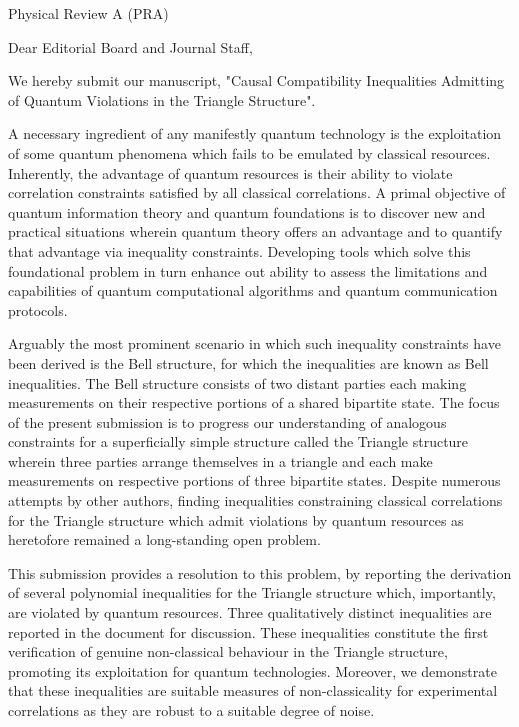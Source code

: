 \documentclass[12pt]{letter}
\begin{document}
\begin{letter}{Physical Review A (PRA)}
{\selectfont
\opening{Dear Editorial Board and Journal Staff,}

We hereby submit our manuscript, "Causal Compatibility Inequalities Admitting of Quantum Violations in the Triangle Structure".


A necessary ingredient of any manifestly quantum technology is the exploitation of some quantum phenomena which fails to be emulated by classical resources. Inherently, the advantage of quantum resources is their ability to violate correlation constraints satisfied by all classical correlations. A primal objective of quantum information theory and quantum foundations is to discover new and practical situations wherein quantum theory offers an advantage and to quantify that advantage via inequality constraints. Developing tools which solve this foundational problem in turn enhance out ability to assess the limitations and capabilities of quantum computational algorithms and quantum communication protocols.


Arguably the most prominent scenario in which such inequality constraints have been derived is the Bell structure, for which the inequalities are known as Bell inequalities. The Bell structure consists of two distant parties each making measurements on their respective portions of a shared bipartite state. The focus of the present submission is to progress our understanding of analogous constraints for a superficially simple structure called the Triangle structure wherein three parties arrange themselves in a triangle and each make measurements on respective portions of three bipartite states. Despite numerous attempts by other authors, finding inequalities constraining classical correlations for the Triangle structure which admit violations by quantum resources as heretofore remained a long-standing open problem.


This submission provides a resolution to this problem, by reporting the derivation of several polynomial inequalities for the Triangle structure which, importantly, are violated by quantum resources. Three qualitatively distinct inequalities are reported in the document for discussion. These inequalities constitute the first verification of genuine non-classical behaviour in the Triangle structure, promoting its exploitation for quantum technologies. Moreover, we demonstrate that these inequalities are suitable measures of non-classicality for experimental correlations as they are robust to a suitable degree of noise.

}
\end{letter}
\end{document}
